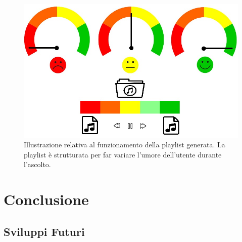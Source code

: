\documentclass[11pt]{report}
\begin{document}
\begin{figure}[h]
\centering
\includegraphics[scale = 1.5]{img/playlist-emotion.jpg}
\caption{Illustrazione relativa al funzionamento della playlist generata. La playlist è strutturata per far variare l'umore dell'utente durante l'ascolto.}
\label{fig:playlist-emozioni}
\end{figure}



















\chapter{Conclusione}

\section{Sviluppi Futuri}




\newpage




\end{document}

